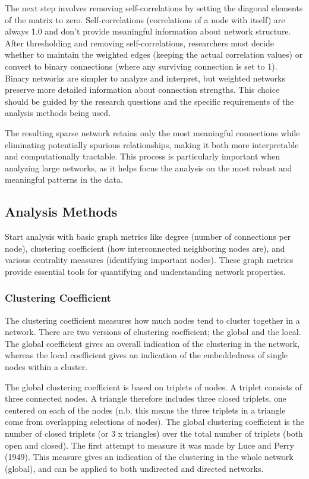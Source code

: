The next step involves removing self-correlations by setting the diagonal elements of the matrix to zero. Self-correlations (correlations of a node with itself) are always 1.0 and don't provide meaningful information about network structure. After thresholding and removing self-correlations, researchers must decide whether to maintain the weighted edges (keeping the actual correlation values) or convert to binary connections (where any surviving connection is set to 1). Binary networks are simpler to analyze and interpret, but weighted networks preserve more detailed information about connection strengths. This choice should be guided by the research questions and the specific requirements of the analysis methods being used.

The resulting sparse network retains only the most meaningful connections while eliminating potentially spurious relationships, making it both more interpretable and computationally tractable. This process is particularly important when analyzing large networks, as it helps focus the analysis on the most robust and meaningful patterns in the data.

\subsection*{Analysis Methods}
Start analysis with basic graph metrics like degree (number of connections per node), clustering coefficient (how interconnected neighboring nodes are), and various centrality measures (identifying important nodes). These graph metrics provide essential tools for quantifying and understanding network properties.  

\subsubsection*{Clustering Coefficient}
The clustering coefficient measures how much nodes tend to cluster together in a network. There are two versions of clustering  coefficient; the global and the local. The global coefficient gives an overall indication of the clustering in the network, whereas the local coefficient gives an indication of the embeddedness of single nodes within a cluster. 

The global clustering coefficient is based on triplets of nodes. A triplet consists of three connected nodes. A triangle therefore includes three closed triplets, one centered on each of the nodes (n.b. this means the three triplets in a triangle come from overlapping selections of nodes). The global clustering coefficient is the number of closed triplets (or 3 x triangles) over the total number of triplets (both open and closed). The first attempt to measure it was made by Luce and Perry (1949). This measure gives an indication of the clustering in the whole network (global), and can be applied to both undirected and directed networks. 

